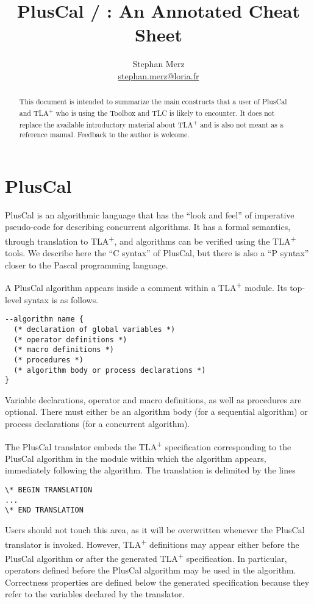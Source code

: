 \documentclass[11pt,fleqn]{article}
\title{PlusCal / \tlaplus: An Annotated Cheat Sheet}
\author{Stephan Merz\\ \url{stephan.merz@loria.fr}}
\date{}
\newcommand{\tlaplus}{TLA\textsuperscript{+}\xspace}
\begin{document}
\maketitle

\begin{abstract}
  This document is intended to summarize the main constructs that a user of
  PlusCal and \tlaplus who is using the Toolbox and TLC is likely to encounter.
  It does not replace the available introductory material about \tlaplus and is
  also not meant as a reference manual. Feedback to the author is welcome.
\end{abstract}

\section{PlusCal}

PlusCal is an algorithmic language that has the ``look and feel'' of imperative
pseudo-code for describing concurrent algorithms. It has a formal semantics,
through translation to \tlaplus, and algorithms can be verified using the
\tlaplus tools. We describe here the ``C syntax'' of PlusCal, but there is also
a ``P syntax'' closer to the Pascal programming language.

A PlusCal algorithm appears inside a comment within a \tlaplus module. Its
top-level syntax is as follows.

\begin{verbatim}
--algorithm name {
  (* declaration of global variables *)
  (* operator definitions *)
  (* macro definitions *)
  (* procedures *)
  (* algorithm body or process declarations *)
}
\end{verbatim}

Variable declarations, operator and macro definitions, as well as procedures are
optional. There must either be an algorithm body (for a sequential algorithm) or
process declarations (for a concurrent algorithm).

The PlusCal translator embeds the \tlaplus specification corresponding to the
PlusCal algorithm in the module within which the algorithm appears, immediately
following the algorithm. The translation is delimited by the lines
%
\begin{verbatim}
\* BEGIN TRANSLATION
...
\* END TRANSLATION
\end{verbatim}
%
Users should not touch this area, as it will be overwritten whenever the PlusCal
translator is invoked. However, \tlaplus definitions may appear either before
the PlusCal algorithm or after the generated \tlaplus specification. In
particular, operators defined before the PlusCal algorithm may be used in the
algorithm. Correctness properties are defined below the generated specification
because they refer to the variables declared by the translator.
\end{document}
